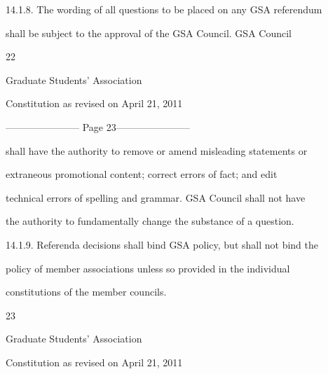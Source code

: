 14.1.8.     The wording of all questions to be placed on any GSA referendum  

        shall  be  subject  to  the  approval  of  the  GSA  Council.  GSA  Council  

                                                

                                             22  



                               Graduate Students’ Association  



                          Constitution as revised on April 21, 2011  


----------------------- Page 23-----------------------

          shall have the authority to remove or amend misleading statements or  

          extraneous   promotional   content;   correct   errors   of   fact;   and   edit  

          technical errors of spelling and grammar.  GSA  Council shall not have  

          the authority to fundamentally change the substance of a question.  



14.1.9.        Referenda decisions shall bind GSA policy, but shall not bind the  

          policy  of  member  associations  unless  so  provided  in  the  individual  

          constitutions of the member councils.  



  



  

  



  



  



                                                            

                                                        23  



                                      Graduate Students’ Association  



                                Constitution as revised on April 21, 2011  


